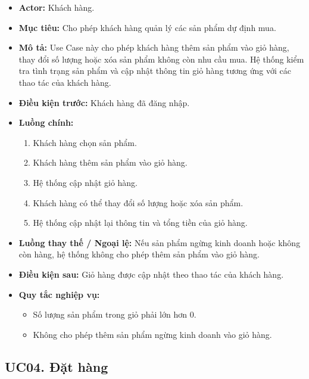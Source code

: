 \documentclass[12pt,a4paper]{article}
\begin{document}
\begin{itemize}

    \item \textbf{Actor:} Khách hàng.

    \item \textbf{Mục tiêu:} Cho phép khách hàng quản lý các sản phẩm dự định mua.

    \item \textbf{Mô tả:} Use Case này cho phép khách hàng thêm sản phẩm vào giỏ hàng, thay đổi số lượng hoặc xóa sản phẩm không còn nhu cầu mua. Hệ thống kiểm tra tình trạng sản phẩm và cập nhật thông tin giỏ hàng tương ứng với các thao tác của khách hàng.

    \item \textbf{Điều kiện trước:} Khách hàng đã đăng nhập.

    \item \textbf{Luồng chính:}
    \begin{enumerate}
        \item Khách hàng chọn sản phẩm.
        \item Khách hàng thêm sản phẩm vào giỏ hàng.
        \item Hệ thống cập nhật giỏ hàng.
        \item Khách hàng có thể thay đổi số lượng hoặc xóa sản phẩm.
        \item Hệ thống cập nhật lại thông tin và tổng tiền của giỏ hàng.
    \end{enumerate}

    \item \textbf{Luồng thay thế / Ngoại lệ:} Nếu sản phẩm ngừng kinh doanh hoặc không còn hàng, hệ thống không cho phép thêm sản phẩm vào giỏ hàng.

    \item \textbf{Điều kiện sau:} Giỏ hàng được cập nhật theo thao tác của khách hàng.

    \item \textbf{Quy tắc nghiệp vụ:}
    \begin{itemize}
        \item Số lượng sản phẩm trong giỏ phải lớn hơn 0.
        \item Không cho phép thêm sản phẩm ngừng kinh doanh vào giỏ hàng.
    \end{itemize}

\end{itemize}

\subsection*{UC04. Đặt hàng}
\end{document}

